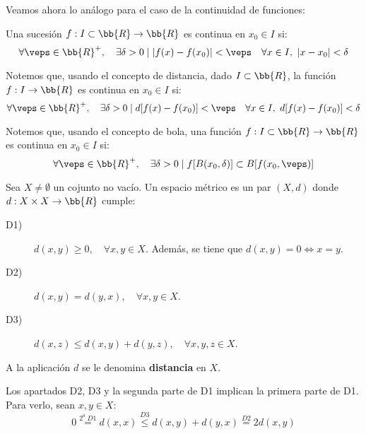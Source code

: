 Veamos ahora lo análogo para el caso de la continuidad de funciones:
\begin{definicion}
    Una sucesión $f:I\subset \bb{R}\to \bb{R}$ es continua en $x_0\in I$ si:
    \begin{equation*}
        \forall \veps\in \bb{R}^+,\quad \exists \delta>0 \mid |f(x)-f(x_0)|<\veps \quad \forall x\in I,~|x-x_0|< \delta 
    \end{equation*}
\end{definicion}

\begin{observacion}
    Notemos que, usando el concepto de distancia, dado $I\subset \bb{R}$, la función $f:I\to \bb{R}$ es continua en $x_0\in I$ si:
    \begin{equation*}
        \forall \veps\in \bb{R}^+,\quad \exists \delta>0 \mid d[f(x)-f(x_0)]<\veps \quad \forall x\in I,~d[f(x)-f(x_0)]< \delta 
    \end{equation*}

    Notemos que, usando el concepto de bola, una función $f:I\subset \bb{R}\to \bb{R}$ es continua en $x_0\in I$ si:
        \begin{equation*}
            \forall \veps\in \bb{R}^+,\quad \exists \delta>0 \mid f[B(x_0,\delta)]\subset B[f(x_0,\veps)]
        \end{equation*}
\end{observacion}


\begin{definicion} 
    Sea $X\neq \emptyset$ un cojunto no vacío. Un espacio métrico es un par $(X,d)$ donde $d:X\times X\to \bb{R}$ cumple:
    \begin{description}
        \item[D1)] $d(x,y)\geq 0, \quad \forall x,y\in X$. Además, se tiene que $d(x,y)=0\Longleftrightarrow x=y$.

        \item[D2)] $d(x,y)=d(y,x), \quad \forall x,y\in X$.

        \item[D3)] $d(x,z)\leq d(x,y)+d(y,z),\quad \forall x,y,z\in X$.
    \end{description}

    A la aplicación $d$ se le denomina \textbf{distancia} en $X$.
\end{definicion}

\begin{observacion}
    Los apartados D2, D3 y la segunda parte de D1 implican la primera parte de D1. Para verlo, sean $x,y\in X$:
    \begin{equation*}
        0\stackrel{2^a~D1}{=} d(x,x) \stackrel{D3}\leq d(x,y) + d(y,x) \stackrel{D2}{=} 2d(x,y)
    \end{equation*}
\end{observacion}

